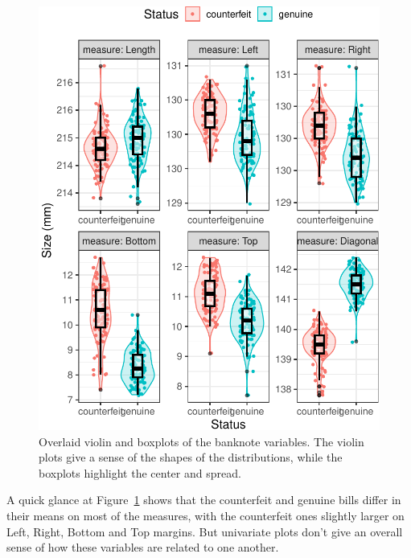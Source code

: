 \documentclass[
  letterpaper,
  10pt,
  krantz2]{krantz}
\begin{document}
\begin{figure}[H]

{\centering \includegraphics[width=1\textwidth,height=\textheight]{figs/fig-banknote-violin-1.pdf}

}

\caption{\label{fig-banknote-violin}Overlaid violin and boxplots of the
banknote variables. The violin plots give a sense of the shapes of the
distributions, while the boxplots highlight the center and spread.}

\end{figure}

A quick glance at Figure~\ref{fig-banknote-violin} shows that the
counterfeit and genuine bills differ in their means on most of the
measures, with the counterfeit ones slightly larger on Left, Right,
Bottom and Top margins. But univariate plots don't give an overall sense
of how these variables are related to one another.
\end{document}
